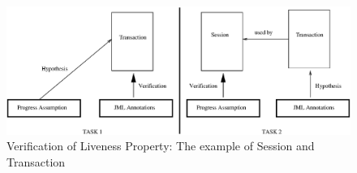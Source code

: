












\begin{figure}[t]
\begin{center}
\includegraphics[scale=0.5]{model.eps}
\end{center}
\caption{Verification of Liveness Property: The example of Session and Transaction}

\label{fig-TS}
\end{figure}


